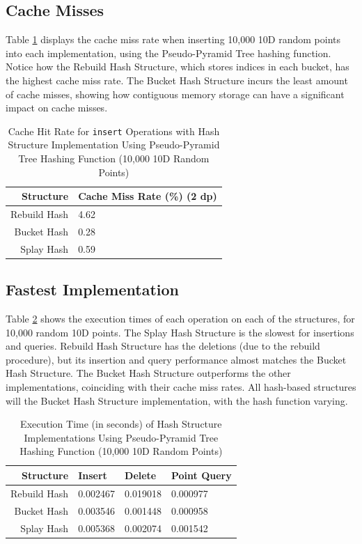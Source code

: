 \subsection{Cache Misses}

Table \ref{tab:perf1-cache-hit-rate} displays the cache miss rate when inserting 10,000 10D random points into each implementation, using the Pseudo-Pyramid Tree hashing function. Notice how the Rebuild Hash Structure, which stores indices in each bucket, has the highest cache miss rate. The Bucket Hash Structure incurs the least amount of cache misses, showing how contiguous memory storage can have a significant impact on cache misses.

\begin{table}
	\centering
	\begin{tabular}{|r|l|}
		\hline
		\textbf{Structure} & \textbf{Cache Miss Rate (\%) (2 dp)} \\
		\hline
		Rebuild Hash & 4.62 \\
		Bucket Hash & 0.28 \\
		Splay Hash & 0.59 \\
		\hline
	\end{tabular}
	\caption{Cache Hit Rate for \texttt{insert} Operations with Hash Structure Implementation Using Pseudo-Pyramid Tree Hashing Function (10,000 10D Random Points)}
	\label{tab:perf1-cache-hit-rate}
\end{table}

\subsection{Fastest Implementation}

Table \ref{tab:hash-implementation-speeds} shows the execution times of each operation on each of the structures, for 10,000 random 10D points. The Splay Hash Structure is the slowest for insertions and queries. Rebuild Hash Structure has the deletions (due to the rebuild procedure), but its insertion and query performance almost matches the Bucket Hash Structure. The Bucket Hash Structure outperforms the other implementations, coinciding with their cache miss rates. All hash-based structures will the Bucket Hash Structure implementation, with the hash function varying.

\begin{table}
	\centering
	\begin{tabular}{|r|l|l|l|}
	\hline
	\textbf{Structure} & \textbf{Insert} & \textbf{Delete} & \textbf{Point Query}  \\
	\hline
	Rebuild Hash & 0.002467 & 0.019018 & 0.000977 \\
	Bucket Hash & 0.003546 & 0.001448 & 0.000958 \\
	Splay Hash &  0.005368 & 0.002074 &  0.001542 \\
	\hline
	\end{tabular}
	\caption{Execution Time (in seconds) of Hash Structure Implementations Using Pseudo-Pyramid Tree Hashing Function (10,000 10D Random Points)}
	\label{tab:hash-implementation-speeds}
\end{table}


